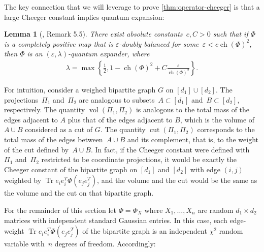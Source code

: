 \documentclass[aos]{imsart}
\newtheorem{lemma}[theorem]{Lemma}
\theoremstyle{definition}
\numberwithin{equation}{section}
\DeclareMathOperator{\vol}{vol}
\DeclareMathOperator{\cut}{cut}
\DeclareMathOperator{\ch}{ch}
\DeclareMathOperator{\tr}{Tr}
\newcommand{\eps}{\varepsilon}
\newcommand{\CF}[1]{{\color{purple}[CF: #1]}}
\newcommand{\MW}[1]{{\color{red}[MW: #1]}}
\newcommand{\CF}[1]{{}}
\newcommand{\MW}[1]{{}}
\begin{document}
\begin{appendix}
The key connection that we will leverage to prove \cref{thm:operator-cheeger} is that a large Cheeger constant implies quantum expansion:

\begin{lemma} [\cite{FM20}, Remark 5.5]\label{lem:op-cheeger}
There exist absolute constants~$c, C>0$ such that if $\Phi$ is a completely positive map that is $\eps$-doubly balanced for some~$\eps < c \ch(\Phi)^2$, then $\Phi$ is an $(\eps,\lambda)$-quantum expander, where
\begin{align*}
  \lambda = \max\left\{ \frac12, 1 -  \ch(\Phi)^2 + C \frac{\eps}{\ch(\Phi)^2} \right\}.
\end{align*}
\end{lemma}

For intuition, consider a weighed bipartite graph $G$ on $[d_1] \cup [d_2]$.
The projections~$\Pi_1$ and~$\Pi_2$ are analogous to subsets~$A \subset[d_1]$ and~$B \subset [d_2]$, respectively.
The quantity $\vol(\Pi_1, \Pi_2)$ is analogous to the total mass of the edges adjacent to $A$ plus that of the edges adjacent to $B$, which is the volume of $A \cup B$ considered as a cut of $G$.
The quantity $\cut(\Pi_1, \Pi_2)$ corresponds to the total mass of the edges between~$A \cup B$ and its complement, that is, to the weight of the cut defined by~$A \cup B$.
In fact, if the Cheeger constant were defined with~$\Pi_1$ and~$\Pi_2$ restricted to be coordinate projections, it would be exactly the Cheeger constant of the bipartite graph on $[d_1]$ and $[d_2]$ with edge $(i,j)$ weighted by $\tr e_i e_i^T \Phi(e_j e_j^T)$, and the volume and the cut would be the same as the volume and the cut on that bipartite graph.

For the remainder of this section let $\Phi = \Phi_X$ where $X_1, \dots, X_n$ are random $d_1 \times d_2$ matrices with independent standard Gaussian entries.
In this case, each edge-weight $\tr e_i e_i^T \Phi(e_j e_j^T)$ of the bipartite graph is an independent $\chi^2$ random variable with~$n$ degrees of freedom.
Accordingly:


\end{appendix}
\end{document}

